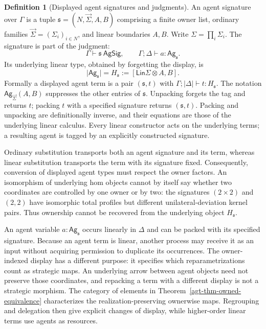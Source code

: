 \documentclass[11pt,a4paper]{article}
\numberwithin{equation}{section}
\theoremstyle{definition}
\newtheorem{definition}[theorem]{Definition}
\theoremstyle{remark}
\theoremstyle{plain}
\providecommand{\Ag}{\mathsf{Ag}}
\providecommand{\sig}{\vec{\Sigma}}
\providecommand{\Lin}{\mathsf{Lin}}
\begin{document}
\begin{definition}[Displayed agent signatures and judgments]
\label{agt-def-displayed-agents}
An agent signature over $\Gamma$ is a tuple
$\mathfrak s=(N,\sig,A,B)$ comprising a finite owner list, ordinary
families $\sig=(\Sigma_i)_{i\in N}$, and linear boundaries $A,B$.  Write
$\Sigma=\prod_i\Sigma_i$.  The signature is part of the judgment:
\[
 \Gamma\vdash\mathfrak s\ \mathsf{AgSig},\qquad
 \Gamma;\Delta\vdash a:\Ag_{\mathfrak s}.
\]
Its underlying linear type, obtained by forgetting the display, is
\[
 \bigl|\Ag_{\mathfrak s}\bigr|=H_{\mathfrak s}
 :=[\Lin\Sigma\otimes A,B].
\]
Formally a displayed agent term is a pair $(\mathfrak s,t)$ with
$\Gamma;|\Delta|\vdash t:H_{\mathfrak s}$.  The notation
$\Ag_{\sig}(A,B)$ suppresses the other entries of $\mathfrak s$.
Unpacking forgets the tag and returns $t$; packing $t$ with a specified
signature returns $(\mathfrak s,t)$.  Packing and unpacking are definitionally inverse, and their equations are those of the underlying linear calculus.  Every linear constructor acts on the underlying terms;
a resulting agent is tagged by an explicitly constructed signature.
\end{definition}

Ordinary substitution transports both an agent signature and its term,
whereas linear substitution transports the term with its signature fixed.
Consequently, conversion of displayed agent types must respect the owner
factors. An isomorphism of underlying hom objects cannot by itself say
whether two coordinates are controlled by one owner or by two: the
signatures $(2\times2)$ and $(2,2)$ have isomorphic total profiles but
different unilateral-deviation kernel pairs. Thus ownership cannot
be recovered from the underlying object $H_{\mathfrak s}$.

An agent variable $a:\Ag_{\mathfrak s}$ occurs linearly in
$\Delta$ and can be packed with its specified signature.
Because an agent term is linear, another process may receive it as an
input without acquiring permission to duplicate its occurrences. The
owner-indexed display has a different purpose: it specifies which
reparametrizations count as strategic maps. An underlying arrow between
agent objects need not preserve those coordinates, and repacking a term
with a different display is not a strategic morphism. The category of
elements in Theorem~\ref{agt-thm-owned-equivalence} characterizes the
realization-preserving ownerwise maps. Regrouping and delegation then give
explicit changes of display, while higher-order linear terms use agents
as resources.
\end{document}
